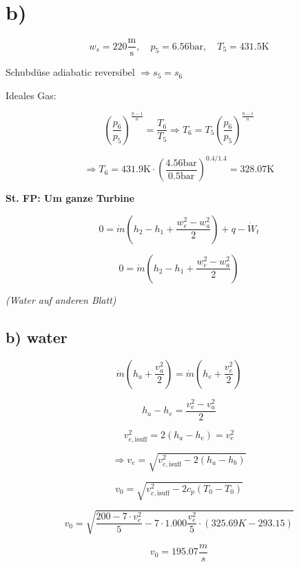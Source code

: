 

\section*{b)}

\[
w_s = 220 \frac{\text{m}}{\text{s}}, \quad p_5 = 6.56 \text{bar}, \quad T_5 = 431.5 \text{K}
\]

Schubdüse adiabatic reversibel \(\Rightarrow s_5 = s_6\)

Ideales Gas:

\[
\left( \frac{p_6}{p_5} \right)^{\frac{n-1}{n}} = \frac{T_6}{T_5} \Rightarrow T_6 = T_5 \left( \frac{p_6}{p_5} \right)^{\frac{n-1}{n}}
\]

\[
\Rightarrow T_6 = 431.9 \text{K} \cdot \left( \frac{4.56 \text{bar}}{0.5 \text{bar}} \right)^{0.4/1.4} = 328.07 \text{K}
\]

\textbf{St. FP: Um ganze Turbine}

\[
0 = \dot{m} (h_2 - h_1 + \frac{w_e^2 - w_a^2}{2}) + q - \dot{W}_t
\]

\[
0 = \dot{m} (h_2 - h_1 + \frac{w_e^2 - w_a^2}{2})
\]

\textit{(Water auf anderen Blatt)}

\subsection*{b) water}

\[
\dot{m}(h_a + \frac{v_a^2}{2}) = \dot{m} (h_e + \frac{v_e^2}{2})
\]

\[
h_a - h_e = \frac{v_e^2 - v_a^2}{2}
\]

\[
v_{e, \text{isuff}}^2 = 2(h_a - h_e) = v_e^2
\]

\[
\Rightarrow v_e = \sqrt{v_{e, \text{isuff}}^2 - 2(h_a - h_b)}
\]

\[
v_0 = \sqrt{v_{e, \text{isuff}}^2 - 2c_p(T_0 - T_0)}
\]

\[
v_0 = \sqrt{\frac{200 - 7 \cdot v_e^2}{5} - 7 \cdot 1.000 \frac{v_e^2}{5} \cdot (325.69K - 293.15)}
\]

\[
v_0 = 195.07 \frac{m}{s}
\]